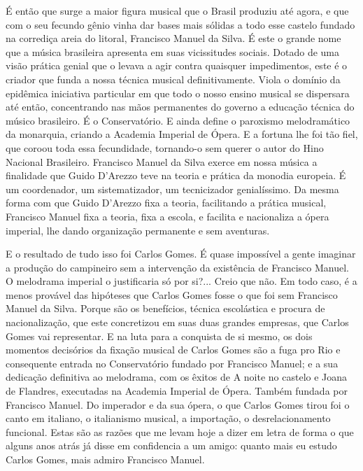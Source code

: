 É então que surge a maior figura musical que o Brasil produziu até
agora, e que com o seu fecundo gênio vinha dar bases mais sólidas a todo
esse castelo fundado na corrediça areia do litoral, Francisco Manuel da
Silva. É este o grande nome que a música brasileira apresenta em suas
vicissitudes sociais. Dotado de uma visão prática genial que o levava a
agir contra quaisquer impedimentos, este é o criador que funda a nossa
técnica musical definitivamente. Viola o domínio da epidêmica iniciativa
particular em que todo o nosso ensino musical se dispersara até então,
concentrando nas mãos permanentes do governo a educação técnica do
músico brasileiro. É o Conservatório. E ainda define o paroxismo
melodramático da monarquia, criando a Academia Imperial de Ópera. E a
fortuna lhe foi tão fiel, que coroou toda essa fecundidade, tornando-o
sem querer o autor do Hino Nacional Brasileiro. Francisco Manuel da
Silva exerce em nossa música a finalidade que Guido D'Arezzo teve na
teoria e prática da monodia europeia. É um coordenador, um
sistematizador, um tecnicizador genialíssimo. Da mesma forma com que
Guido D'Arezzo fixa a teoria, facilitando a prática musical, Francisco
Manuel fixa a teoria, fixa a escola, e facilita e nacionaliza a ópera
imperial, lhe dando organização permanente e sem aventuras.

E o resultado de tudo isso foi Carlos Gomes. É quase impossível a gente
imaginar a produção do campineiro sem a intervenção da existência de
Francisco Manuel. O melodrama imperial o justificaria só por si?...
Creio que não. Em todo caso, é a menos provável das hipóteses que Carlos
Gomes fosse o que foi sem Francisco Manuel da Silva. Porque são os
benefícios, técnica escolástica e procura de nacionalização, que este
concretizou em suas duas grandes empresas, que Carlos Gomes vai
representar. E na luta para a conquista de si mesmo, os dois momentos
decisórios da fixação musical de Carlos Gomes são a fuga pro Rio e
consequente entrada no Conservatório fundado por Francisco Manuel; e a
sua dedicação definitiva ao melodrama, com os êxitos de A noite no
castelo e Joana de Flandres, executadas na Academia Imperial de Ópera.
Também fundada por Francisco Manuel. Do imperador e da sua ópera, o que
Carlos Gomes tirou foi o canto em italiano, o italianismo musical, a
importação, o desrelacionamento funcional. Estas são as razões que me
levam hoje a dizer em letra de forma o que alguns anos atrás já disse em
confidencia a um amigo: quanto mais eu estudo Carlos Gomes, mais admiro
Francisco Manuel.

